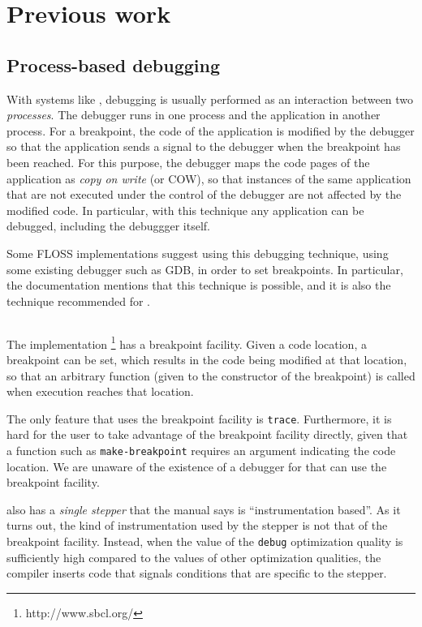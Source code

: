 \section{Previous work}

\subsection{Process-based debugging}

With systems like \unix{}, debugging is usually performed as an
interaction between two \emph{processes}.  The debugger runs in one
process and the application in another process.  For a breakpoint, the
code of the application is modified by the debugger so that the
application sends a signal to the debugger when the breakpoint has
been reached.  For this purpose, the debugger maps the code pages of
the application as \emph{copy on write} (or COW), so that instances of
the same application that are not executed under the control of the
debugger are not affected by the modified code.  In particular, with
this technique any application can be debugged, including the
debuggger itself.

Some FLOSS \commonlisp{} implementations suggest using this debugging
technique, using some existing debugger such as GDB, in order to set
breakpoints.  In particular, the \ccl{} documentation mentions that
this technique is possible, and it is also the technique recommended
for \ecl{}.

\subsection{\sbcl{}}

The \sbcl{} \commonlisp{} implementation%
\footnote{http://www.sbcl.org/}
has a breakpoint facility.  Given a code location, a breakpoint can be
set, which results in the code being modified at that location, so
that an arbitrary function (given to the constructor of the
breakpoint) is called when execution reaches that location.

The only feature that uses the breakpoint facility is \texttt{trace}.
Furthermore, it is hard for the user to take advantage of the
breakpoint facility directly, given that a function such as
\texttt{make-breakpoint} requires an argument indicating the code
location.  We are unaware of the existence of a debugger for \sbcl{}
that can use the breakpoint facility.

\sbcl{} also has a \emph{single stepper} that the manual says is
``instrumentation based''.  As it turns out, the kind of
instrumentation used by the stepper is not that of the breakpoint
facility.  Instead, when the value of the \texttt{debug} optimization
quality is sufficiently high compared to the values of other
optimization qualities, the compiler inserts code that signals
conditions that are specific to the stepper.

